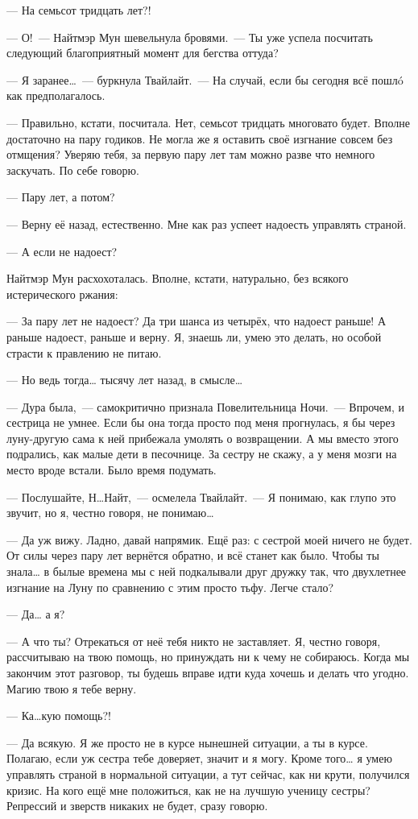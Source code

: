 \documentclass[twoside,a5paper,12pt]{extbook}
\begin{document}
— На семьсот тридцать лет?!

— О! — Найтмэр Мун шевельнула бровями. — Ты уже успела посчитать следующий благоприятный момент для бегства оттуда?

— Я заранее… — буркнула Твайлайт. — На случай, если бы сегодня всё пошлó как предполагалось.

— Правильно, кстати, посчитала. Нет, семьсот тридцать многовато будет. Вполне достаточно на пару годиков. Не могла же я оставить своё изгнание совсем без отмщения? Уверяю тебя, за первую пару лет там можно разве что немного заскучать. По себе говорю.

— Пару лет, а потом?

— Верну её назад, естественно. Мне как раз успеет надоесть управлять страной.

— А если не надоест?

Найтмэр Мун расхохоталась. Вполне, кстати, натурально, без всякого истерического ржания:

— За пару лет не надоест? Да три шанса из четырёх, что надоест раньше! А раньше надоест, раньше и верну. Я, знаешь ли, умею это делать, но особой страсти к правлению не питаю.

— Но ведь тогда… тысячу лет назад, в смысле…

— Дура была, — самокритично признала Повелительница Ночи. — Впрочем, и сестрица не умнее. Если бы она тогда просто под меня прогнулась, я бы через луну-другую сама к ней прибежала умолять о возвращении. А мы вместо этого подрались, как малые дети в песочнице. За сестру не скажу, а у меня мозги на место вроде встали. Было время подумать.

— Послушайте, Н…Найт, — осмелела Твайлайт. — Я понимаю, как глупо это звучит, но я, честно говоря, не понимаю…

— Да уж вижу. Ладно, давай напрямик. Ещё раз: с сестрой моей ничего не будет. От силы через пару лет вернётся обратно, и всё станет как было. Чтобы ты знала… в былые времена мы с ней подкалывали друг дружку так, что двухлетнее изгнание на Луну по сравнению с этим просто тьфу. Легче стало?

— Да… а я?

— А что ты? Отрекаться от неё тебя никто не заставляет. Я, честно говоря, рассчитываю на твою помощь, но принуждать ни к чему не собираюсь. Когда мы закончим этот разговор, ты будешь вправе идти куда хочешь и делать что угодно. Магию твою я тебе верну.

— Ка…кую помощь?!

— Да всякую. Я же просто не в курсе нынешней ситуации, а ты в курсе. Полагаю, если уж сестра тебе доверяет, значит и я могу. Кроме того… я умею управлять страной в нормальной ситуации, а тут сейчас, как ни крути, получился кризис. На кого ещё мне положиться, как не на лучшую ученицу сестры? Репрессий и зверств никаких не будет, сразу говорю.
\end{document}
